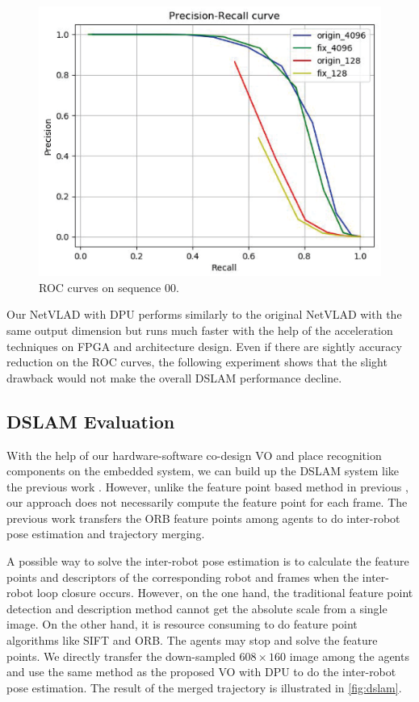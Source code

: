 \begin{figure}[t]
  \centering  
  \includegraphics[width=0.85\linewidth]{fig/val_reloc.eps}
  \caption{ROC curves on sequence 00.}
  \label{fig:reloc}
\end{figure}

Our NetVLAD with DPU performs similarly to the original NetVLAD with the same output dimension but runs much faster with the help of the acceleration techniques on FPGA and architecture design. Even if there are sightly accuracy reduction on the ROC curves, the following experiment shows that the slight drawback would not make the overall DSLAM performance decline.

\subsection{DSLAM Evaluation}

With the help of our hardware-software co-design VO and place recognition components on the embedded system, we can build up the DSLAM system like the previous work \cite{Cieslewski:20187ee}. However, unlike the feature point based method in previous \cite{Cieslewski:20187ee}, our approach does not necessarily compute the feature point for each frame. The previous work \cite{Cieslewski:20187ee} transfers the ORB feature points among agents to do inter-robot pose estimation and trajectory merging.


A possible way to solve the inter-robot pose estimation is to calculate the feature points and descriptors of the corresponding robot and frames when the inter-robot loop closure occurs. However, on the one hand, the traditional feature point detection and description method cannot get the absolute scale from a single image. On the other hand, it is resource consuming to do feature point algorithms like SIFT\cite{Jegou:2010f45} and ORB\cite{Mur-Artal:2017281}. The agents may stop and solve the feature points. We directly transfer the down-sampled $608 \times 160$ image among the agents and use the same method as the proposed VO with DPU to do the inter-robot pose estimation. The result of the merged trajectory is illustrated in \cref{fig:dslam}.


